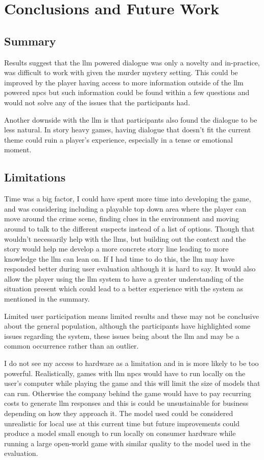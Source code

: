 \documentclass[12pt, a4paper]{report}
\begin{document}
	\chapter{Conclusions and Future Work}
	\section{Summary}
	Results suggest that the \gls{llm} powered dialogue was only a novelty and in-practice, was difficult to work with given the murder mystery setting. This could be improved by the player having access to more information outside of the \gls{llm} powered \gls{npc}s but such information could be found within a few questions and would not solve any of the issues that the participants had.
	
	Another downside with the \gls{llm} is that participants also found the dialogue to be less natural. In story heavy games, having dialogue that doesn't fit the current theme could ruin a player's experience, especially in a tense or emotional moment.
	
	\section{Limitations}
	Time was a big factor, I could have spent more time into developing the game, and was considering including a playable top down area where the player can move around the crime scene, finding clues in the environment and moving around to talk to the different suspects instead of a list of options. Though that wouldn't necessarily help with the \gls{llm}s, but building out the context and the story would help me develop a more concrete story line leading to more knowledge the \gls{llm} can lean on. If I had time to do this, the \gls{llm} may have responded better during user evaluation although it is hard to say. It would also allow the player using the \gls{llm} system to have a greater understanding of the situation present which could lead to a better experience with the system as mentioned in the summary.
	
	Limited user participation means limited results and these may not be conclusive about the general population, although the participants have highlighted some issues regarding the system, these issues being about the \gls{llm} and may be a common occurrence rather than an outlier.
	
	I do not see my access to hardware as a limitation and in is more likely to be too powerful. Realistically, games with \gls{llm} \gls{npc}s would have to run locally on the user's computer while playing the game and this will limit the size of models that can run. Otherwise the company behind the game would have to pay recurring costs to generate \gls{llm} responses and this is could be unsustainable for business depending on how they approach it. The model used could be considered unrealistic for local use at this current time but future improvements could produce a model small enough to run locally on consumer hardware while running a large open-world game with similar quality to the model used in the evaluation.
	
\end{document}
